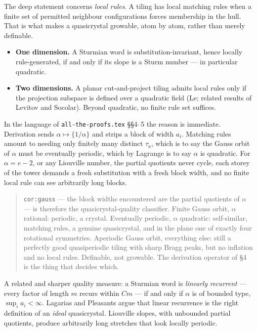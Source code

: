 \documentclass[11pt,a4paper]{article}
\theoremstyle{definition}
\theoremstyle{plain}
\begin{document}
The deep statement concerns \emph{local rules}. A tiling has local matching
rules when a finite set of permitted neighbour configurations forces membership
in the hull. That is what makes a quasicrystal growable, atom by atom, rather
than merely definable.

\begin{itemize}
\item \textbf{One dimension.} A Sturmian word is substitution-invariant, hence
  locally rule-generated, if and only if its slope is a Sturm number --- in
  particular quadratic.
\item \textbf{Two dimensions.} A planar cut-and-project tiling admits local
  rules only if the projection subspace is defined over a quadratic field
  (Le; related results of Levitov and Socolar). Beyond quadratic, no finite rule
  set suffices.
\end{itemize}

In the language of \texttt{all-the-proofs.tex} \S\S4--5 the reason is
immediate. Derivation sends $\alpha \mapsto \{1/\alpha\}$ and strips a block of
width $a_i$. Matching rules amount to needing only finitely many distinct
$\tau_a$, which is to say the Gauss orbit of $\alpha$ must be eventually
periodic, which by Lagrange is to say $\alpha$ is quadratic. For
$\alpha = e - 2$, or any Liouville number, the partial quotients never cycle,
each storey of the tower demands a fresh substitution with a fresh block width,
and no finite local rule can see arbitrarily long blocks.

\begin{quote}
\texttt{cor:gauss} --- the block widths encountered are the partial quotients of
$\alpha$ --- is therefore the quasicrystal-quality classifier. Finite Gauss
orbit, $\alpha$ rational: periodic, a crystal. Eventually periodic, $\alpha$
quadratic: self-similar, matching rules, a genuine quasicrystal, and in the
plane one of exactly four rotational symmetries. Aperiodic Gauss orbit,
everything else: still a perfectly good quasiperiodic tiling with sharp Bragg
peaks, but no inflation and no local rules. Definable, not growable. The
derivation operator of \S4 is the thing that decides which.
\end{quote}

A related and sharper quality measure: a Sturmian word is \emph{linearly
recurrent} --- every factor of length $m$ recurs within $Cm$ --- if and only if
$\alpha$ is of bounded type, $\sup_i a_i < \infty$. Lagarias and Pleasants argue
that linear recurrence is the right definition of an \emph{ideal} quasicrystal.
Liouville slopes, with unbounded partial quotients, produce arbitrarily long
stretches that look locally periodic.
\end{document}
